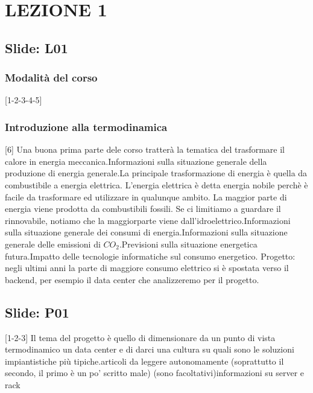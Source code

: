 \section{LEZIONE 1}
\subsection{Slide: L01}
\subsubsection{Modalità del corso}
[1-2-3-4-5]
\subsubsection{Introduzione alla termodinamica}
[6] Una buona prima parte dele corso tratterà la tematica del trasformare il calore in energia meccanica.\newline
[7] Informazioni sulla situazione generale della produzione di energia generale.\newline
[8] La principale trasformazione di energia è quella da combustibile a energia elettrica. L'energia elettrica è detta energia nobile perchè è facile da trasformare ed utilizzare in qualunque ambito. La maggior parte di energia viene prodotta da combustibili fossili. Se ci limitiamo a guardare il rinnovabile, notiamo che la maggiorparte viene dall'idroelettrico.\newline
[9] Informazioni sulla situazione generale dei consumi di energia.\newline
[10-11] Informazioni sulla situazione generale delle emissioni di $CO_2$.\newline
[12] Previsioni sulla situazione energetica futura.\newline
[13] Impatto delle tecnologie informatiche sul consumo energetico. Progetto: negli ultimi anni la parte di maggiore consumo elettrico si è spostata verso il backend, per esempio il data center che analizzeremo per il progetto.
\subsection{Slide: P01}
[1-2-3] Il tema del progetto è quello di dimensionare da un punto di vista termodinamico un data center e di darci una cultura su quali sono le soluzioni impiantistiche più tipiche.\newline
[4] articoli da leggere autonomamente (soprattutto il secondo, il primo è un po' scritto male) (sono facoltativi)\newline
[5] informazioni su server e rack
